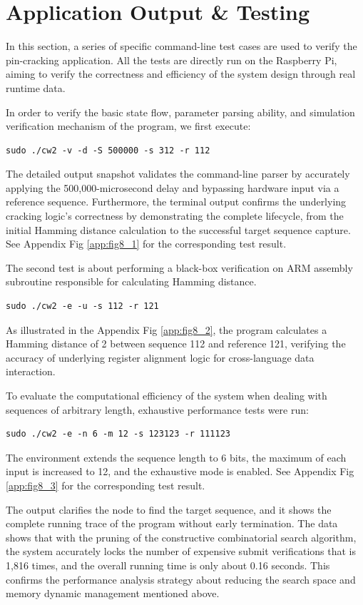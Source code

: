 \section{Application Output \& Testing}
\label{sec:application_output}

In this section, a series of specific command-line test cases are used to verify the pin-cracking application. All the tests are directly run on the Raspberry Pi, aiming to verify the correctness and efficiency of the system design through real runtime data.

In order to verify the basic state flow, parameter parsing ability, and simulation verification mechanism of the program, we first execute:

\vspace{0.5em}

\begin{verbatim}
sudo ./cw2 -v -d -S 500000 -s 312 -r 112
\end{verbatim}

The detailed output snapshot validates the command-line parser by accurately applying the 500,000-microsecond delay and bypassing hardware input via a reference sequence. Furthermore, the terminal output confirms the underlying cracking logic's correctness by demonstrating the complete lifecycle, from the initial Hamming distance calculation to the successful target sequence capture.
See Appendix Fig \ref{app:fig8_1} for the corresponding test result.

The second test is about performing a black-box verification on ARM assembly subroutine responsible for calculating Hamming distance. 

\begin{verbatim}
sudo ./cw2 -e -u -s 112 -r 121
\end{verbatim}

As illustrated in the Appendix Fig \ref{app:fig8_2}, the program calculates a Hamming distance of 2 between sequence 112 and reference 121, verifying the accuracy of underlying register alignment logic for cross-language data interaction.

To evaluate the computational efficiency of the system when dealing with sequences of arbitrary length, exhaustive performance tests were run:

\begin{verbatim}
sudo ./cw2 -e -n 6 -m 12 -s 123123 -r 111123
\end{verbatim}

The environment extends the sequence length to 6 bits, the maximum of each input is increased to 12, and the exhaustive mode is enabled. 
See Appendix Fig \ref{app:fig8_3} for the corresponding test result.

The output clarifies the node to find the target sequence, and it shows the complete running trace of the program without early termination. The data shows that with the pruning of the constructive combinatorial search algorithm, the system accurately locks the number of expensive submit verifications that is 1,816 times, and the overall running time is only about 0.16 seconds. This confirms the performance analysis strategy about reducing the search space and memory dynamic management mentioned above.
